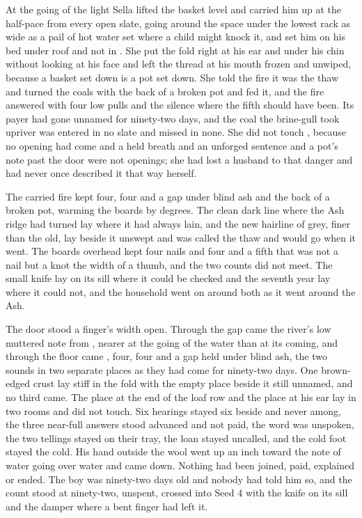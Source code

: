 \scenebreak

At the going of the light Sella lifted the basket level and carried him up at the half-pace from every open slate, going around the space under the lowest rack as wide as a pail of hot water set where a child might knock it, and set him on his bed under  roof and not in . She put the fold right at his ear and under his chin without looking at his face and left the thread at his mouth frozen and unwiped, because a basket set down is a pot set down. She told the fire it was the thaw and turned the coals with the back of a broken pot and fed it, and the fire answered with four low pulls and the silence where the fifth should have been. Its payer had gone unnamed for ninety-two days, and the coal the brine-gull took upriver was entered in no slate and missed in none. She did not touch , because no opening had come and a held breath and an unforged sentence and a pot’s note past the door were not openings; she had lost a husband to that danger and had never once described it that way herself.

The carried fire kept four, four and a gap under blind ash and the back of a broken pot, warming the boards by degrees. The clean dark line where the Ash ridge had turned lay where it had always lain, and the new hairline of grey, finer than the old, lay beside it unswept and was called the thaw and would go when it went. The boards overhead kept four nails and four and a fifth that was not a nail but a knot the width of a thumb, and the two counts did not meet. The small knife lay on its sill where it could be checked and the seventh year lay where it could not, and the household went on around both as it went around the Ash.

The door stood a finger’s width open. Through the gap came the river’s low muttered note from , nearer at the going of the water than at its coming, and through the floor came , four, four and a gap held under blind ash, the two sounds in two separate places as they had come for ninety-two days. One brown-edged crust lay stiff in the fold with the empty place beside it still unnamed, and no third came. The place at the end of the loaf row and the place at his ear lay in two rooms and did not touch. Six hearings stayed six beside and never among, the three near-full answers stood advanced and not paid, the word was unspoken, the two tellings stayed on their tray, the loan stayed uncalled, and the cold foot stayed the cold. His hand outside the wool went up an inch toward the note of water going over water and came down. Nothing had been joined, paid, explained or ended. The boy was ninety-two days old and nobody had told him so, and the count stood at ninety-two, unspent, crossed into Seed 4 with the knife on its sill and the damper where a bent finger had left it.
